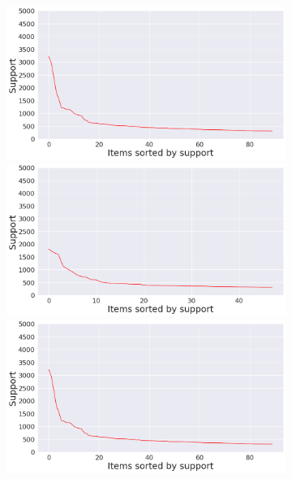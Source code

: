\documentclass[12pt,%
               a4paper,%
               oneside,openany,%
               titlepage,%
               headinclude,footinclude,%
               BCOR5mm,%
               cleardoublepage=empty,%
               tablecaptionabove,%
               floatperchapter,
               ]{scrreprt}                 %
\begin{document}
\begin{figure}[ht]
\begin{minipage}[b]{0.5\linewidth}
\begin{figure}[ht]
\begin{minipage}[b]{0.5\linewidth}
\centering
 \includegraphics[width=.9\linewidth]{Figures/Support_distrubution_Rareearth.png}
 \vspace{4ex}
\end{minipage}
  \begin{minipage}[b]{0.5\linewidth}
    \centering
    \includegraphics[width=.9\linewidth]{Figures/Support_distrubution_Afghanistan.png}
    \vspace{4ex}
  \end{minipage}%
    \begin{minipage}[b]{0.5\linewidth}
   \centering
    \includegraphics[width=.9\linewidth]{Figures/Support_distrubution_Rareearth.png}

\end{minipage}
\end{figure}
\end{minipage}
\end{figure}
\end{document}
